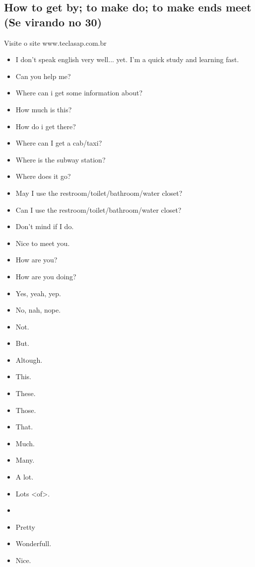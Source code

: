 \documentclass[12pt,a4paper]{article} %
\begin{document}
\subsection{How to get by; to make do; to make ends meet (Se virando no 30)}
Visite o site www.teclasap.com.br\\
	\begin{itemize}
		\item I don't speak english very well... yet. I'm a quick study and learning fast.
		\item Can you help me?
		\item Where can i get some information about?
		\item How much is this?
		\item How do i get there?
		\item Where can I get a cab/taxi?
		\item Where is the subway station?
		\item Where does it go?
		\item May I use the restroom/toilet/bathroom/water closet?
		\item Can I use the restroom/toilet/bathroom/water closet?
		\item Don't mind if I do.
		\item Nice to meet you.
		\item How are you?
		\item How are you doing?
		\item Yes, yeah, yep.
		\item No, nah, nope.
		\item Not.
		\item But.
		\item Altough.
		\item This.
		\item These.
		\item Those.
		\item That.
		\item Much.
		\item Many.
		\item A lot.
		\item Lots <of>.
		\item 
		\item Pretty
		\item Wonderfull.
		\item Nice.
	\end{itemize}
\end{document}
